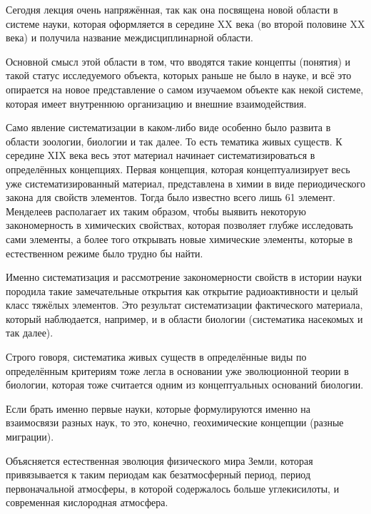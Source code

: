 \documentclass[main.tex]{subfiles}
\begin{document}


Сегодня лекция очень напряжённая, так как она посвящена новой области в системе науки, которая оформляется в середине XX века (во второй половине XX века) и получила название междисциплинарной области.

Основной смысл этой области в том, что вводятся такие концепты (понятия) и такой статус исследуемого объекта, которых раньше не было в науке, и всё это опирается на новое представление о самом изучаемом объекте как некой системе, которая имеет внутреннюю организацию и внешние взаимодействия.



Само явление систематизации в каком-либо виде особенно было развита в области зоологии, биологии и так далее.
То есть тематика живых существ.
К середине XIX века весь этот материал начинает систематизироваться в определённых концепциях.
Первая концепция, которая концептуализирует весь уже систематизированный материал, представлена в химии в виде периодического закона для свойств элементов.
Тогда было известно всего лишь 61 элемент.
Менделеев располагает их таким образом, чтобы выявить некоторую закономерность в химических свойствах, которая позволяет глубже исследовать сами элементы, а более того открывать новые химические элементы, которые в естественном режиме было трудно бы найти.

Именно систематизация и рассмотрение закономерности свойств в истории науки породила такие замечательные открытия как открытие радиоактивности и целый класс тяжёлых элементов.
Это результат систематизации фактического материала, который наблюдается, например, и в области биологии (систематика насекомых и так далее).

Строго говоря, систематика живых существ в определённые виды по определённым критериям тоже легла в основании уже эволюционной теории в биологии, которая тоже считается одним из концептуальных оснований биологии.

Если брать именно первые науки, которые формулируются именно на взаимосвязи разных наук, то это, конечно, геохимические концепции (разные миграции).

Объясняется естественная эволюция физического мира Земли, которая привязывается к таким периодам как безатмосферный период, период первоначальной атмосферы, в которой содержалось больше углекисилоты, и современная кислородная атмосфера.
\end{document}
